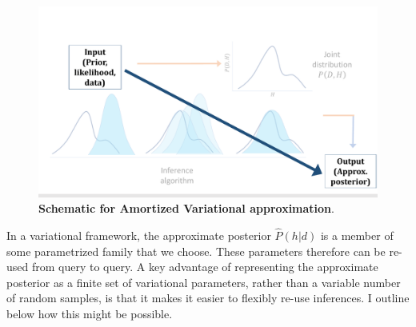 \begin{figure}[t!]
\centering
\includegraphics[width = \textwidth]{figures/var_schematic_amort.pdf}
\caption{\textbf{Schematic for Amortized Variational approximation}. }
\label{fig:var_schematic_amort}
\end{figure}

In a variational framework, the approximate posterior $\hat{P}(h | d)$ is a member of some parametrized family that we choose. These parameters therefore can be re-used from query to query. A key advantage of representing the approximate posterior as a finite set of variational parameters, rather than a variable number of random samples, is that it makes it easier to flexibly re-use inferences. I outline below how this might be possible.

